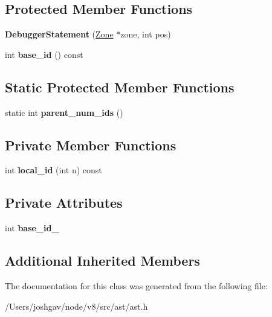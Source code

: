 \subsection*{Protected Member Functions}
\begin{DoxyCompactItemize}
\item 
{\bfseries Debugger\+Statement} (\hyperlink{classv8_1_1internal_1_1_zone}{Zone} $\ast$zone, int pos)\hypertarget{classv8_1_1internal_1_1_debugger_statement_a2f395b160ca3542fc46d010523cb3a8e}{}\label{classv8_1_1internal_1_1_debugger_statement_a2f395b160ca3542fc46d010523cb3a8e}

\item 
int {\bfseries base\+\_\+id} () const \hypertarget{classv8_1_1internal_1_1_debugger_statement_a7b4f633602b05ceb64b47517b0a92862}{}\label{classv8_1_1internal_1_1_debugger_statement_a7b4f633602b05ceb64b47517b0a92862}

\end{DoxyCompactItemize}
\subsection*{Static Protected Member Functions}
\begin{DoxyCompactItemize}
\item 
static int {\bfseries parent\+\_\+num\+\_\+ids} ()\hypertarget{classv8_1_1internal_1_1_debugger_statement_aab8cd27ea8a6582b6769aa7c5428bb95}{}\label{classv8_1_1internal_1_1_debugger_statement_aab8cd27ea8a6582b6769aa7c5428bb95}

\end{DoxyCompactItemize}
\subsection*{Private Member Functions}
\begin{DoxyCompactItemize}
\item 
int {\bfseries local\+\_\+id} (int n) const \hypertarget{classv8_1_1internal_1_1_debugger_statement_aced96dc2f519e17ac193eefdc40f296c}{}\label{classv8_1_1internal_1_1_debugger_statement_aced96dc2f519e17ac193eefdc40f296c}

\end{DoxyCompactItemize}
\subsection*{Private Attributes}
\begin{DoxyCompactItemize}
\item 
int {\bfseries base\+\_\+id\+\_\+}\hypertarget{classv8_1_1internal_1_1_debugger_statement_a6a0a22a0cc3949db1acdeb42d6f3927b}{}\label{classv8_1_1internal_1_1_debugger_statement_a6a0a22a0cc3949db1acdeb42d6f3927b}

\end{DoxyCompactItemize}
\subsection*{Additional Inherited Members}


The documentation for this class was generated from the following file\+:\begin{DoxyCompactItemize}
\item 
/\+Users/joshgav/node/v8/src/ast/ast.\+h\end{DoxyCompactItemize}
